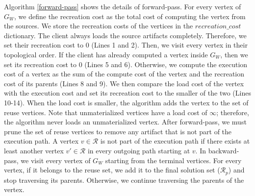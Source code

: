 Algorithm \ref{forward-pass} shows the details of forward-pass.
For every vertex of $G_W$, we define the recreation cost as the total cost of computing the vertex from the sources.
We store the recreation costs of the vertices in the $recreation\_cost$ dictionary.
The client always loads the source artifacts completely.
Therefore, we set their recreation cost to 0 (Lines 1 and 2).
Then, we visit every vertex in their topological order.
If the client has already computed a vertex inside $G_W$, then we set its recreation cost to 0 (Lines 5 and 6).
Otherwise, we compute the execution cost of a vertex as the sum of the compute cost of the vertex and the recreation cost of its parents (Lines 8 and 9).
We then compare the load cost of the vertex with the execution cost and set its recreation cost to the smaller of the two (Lines 10-14).
When the load cost is smaller, the algorithm adds the vertex to the set of reuse vertices.
Note that unmaterialized vertices have a load cost of $\infty$; therefore, the algorithm never loads an unmaterialized vertex.
After forward-pass, we must prune the set of reuse vertices to remove any artifact that is not part of the execution path.
A vertex $v \in \mathcal{R}$ is not part of the execution path if there exists at least another vertex $v' \in \mathcal{R}$ in every outgoing path starting at $v$.
In backward-pass, we visit every vertex of $G_W$ starting from the terminal vertices.
For every vertex, if it belongs to the reuse set, we add it to the final solution set ($\mathcal{R}_p$) and stop traversing its parents.
Otherwise, we continue traversing the parents of the vertex.

